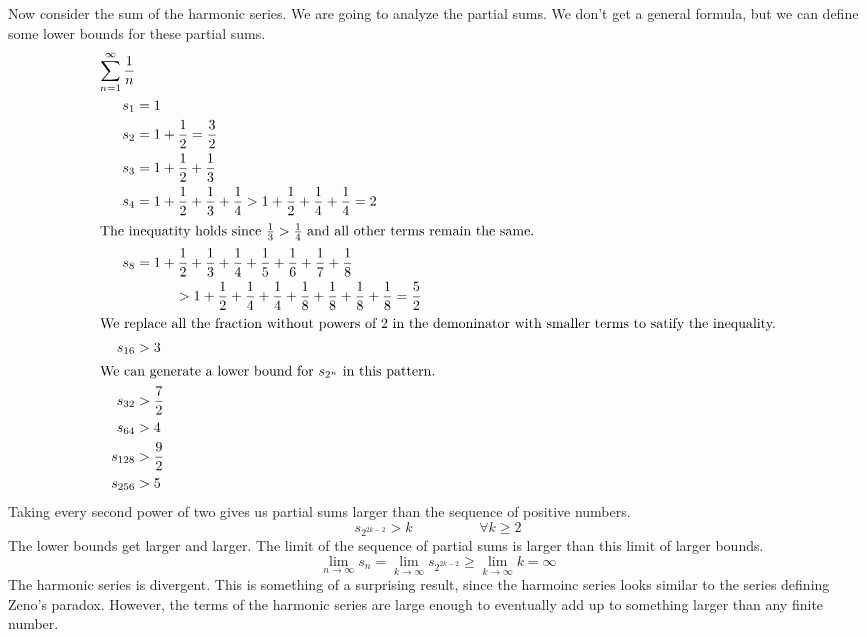 \documentclass[fleqn]{report}
\begin{document}
\begin{example} Now consider the sum of the harmonic series.
We are going to analyze the partial sums. We don't get a
general formula, but we can define some lower
bounds for these partial sums.
\begin{align*}
\sum_{n=1}^\infty \frac{1}{n} & \\
s_1 & = 1 \\
s_2 & = 1 + \frac{1}{2} = \frac{3}{2} \\
s_3 & = 1 + \frac{1}{2} + \frac{1}{3} \\
s_4 & = 1 + \frac{1}{2} + \frac{1}{3} + \frac{1}{4} > 
1 + \frac{1}{2} + \frac{1}{4} + \frac{1}{4} = 2 \\
\intertext{The inequatity holds since $\frac{1}{3} >
\frac{1}{4}$ and all other terms remain the same.}
s_8 & = 1 + \frac{1}{2} + \frac{1}{3} + \frac{1}{4} +
\frac{1}{5} + \frac{1}{6} + \frac{1}{7} + \frac{1}{8} \\
& \hspace{1cm} > 
1 + \frac{1}{2} + \frac{1}{4} + \frac{1}{4} +
\frac{1}{8} + \frac{1}{8} + \frac{1}{8} + \frac{1}{8} =
\frac{5}{2} \\
\intertext{We replace all the fraction without powers of 2 in
the demoninator with smaller terms to satify the inequality.}
s_{16} & > 3 \\
\intertext{We can generate a lower bound for $s_{2^n}$ in this
pattern.}
s_{32} & > \frac{7}{2} \\
s_{64} & > 4 \\
s_{128} & > \frac{9}{2} \\
s_{256} & > 5 
\end{align*}
Taking every second power of two gives us partial sums larger
than the sequence of positive numbers.
\begin{equation*}
s_{2^{2k-2}} > k \hspace{2cm} \forall k \geq 2
\end{equation*}
The lower bounds get larger and larger. The limit of the
sequence of partial sums is larger than this limit of larger
bounds. 
\begin{equation*}
\lim_{n \rightarrow \infty} s_n = \lim_{k \rightarrow \infty}
s_{2^{2k-2}} \geq \lim_{k \rightarrow \infty}
k = \infty
\end{equation*}
The harmonic series is divergent. This is something of a
surprising result, since the harmoinc series looks similar to
the series defining Zeno's paradox. However, the terms of the
harmonic series are large enough to eventually add up to
something larger than any finite number. 
\end{example}
\end{document}

